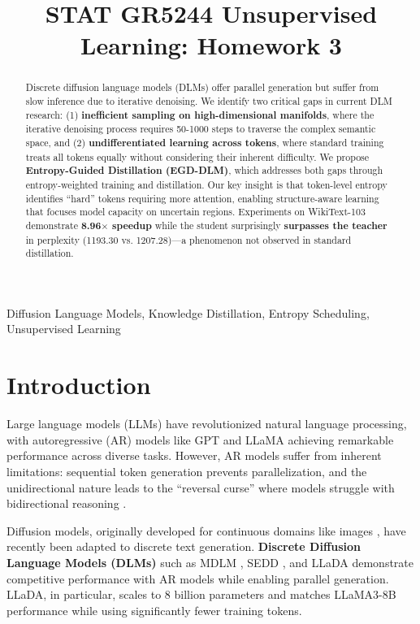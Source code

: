 \documentclass[conference]{IEEEtran}
\title{STAT GR5244 Unsupervised Learning: Homework 3}
\author{
\IEEEauthorblockN{Jiayi Chen}
\IEEEauthorblockA{Department of Statistics\\
Columbia University\\
New York, NY 10027\\
\texttt{jc6601@columbia.edu}}
}
\begin{document}
\maketitle

\begin{abstract}
Discrete diffusion language models (DLMs) offer parallel generation but suffer from slow inference due to iterative denoising. We identify two critical gaps in current DLM research: (1) \textbf{inefficient sampling on high-dimensional manifolds}, where the iterative denoising process requires 50-1000 steps to traverse the complex semantic space, and (2) \textbf{undifferentiated learning across tokens}, where standard training treats all tokens equally without considering their inherent difficulty. We propose \textbf{Entropy-Guided Distillation (EGD-DLM)}, which addresses both gaps through entropy-weighted training and distillation. Our key insight is that token-level entropy identifies ``hard'' tokens requiring more attention, enabling structure-aware learning that focuses model capacity on uncertain regions. Experiments on WikiText-103 demonstrate \textbf{8.96$\times$ speedup} while the student surprisingly \textbf{surpasses the teacher} in perplexity (1193.30 vs. 1207.28)---a phenomenon not observed in standard distillation.
\end{abstract}

\begin{IEEEkeywords}
Diffusion Language Models, Knowledge Distillation, Entropy Scheduling, Unsupervised Learning
\end{IEEEkeywords}

\section{Introduction}
\label{sec:intro}

Large language models (LLMs) have revolutionized natural language processing, with autoregressive (AR) models like GPT \cite{radford2019language} and LLaMA \cite{touvron2023llama} achieving remarkable performance across diverse tasks. However, AR models suffer from inherent limitations: sequential token generation prevents parallelization, and the unidirectional nature leads to the ``reversal curse'' where models struggle with bidirectional reasoning \cite{berglund2023reversal}.

Diffusion models, originally developed for continuous domains like images \cite{ho2020denoising, song2020score}, have recently been adapted to discrete text generation. \textbf{Discrete Diffusion Language Models (DLMs)} such as MDLM \cite{sahoo2024simple}, SEDD \cite{lou2024discrete}, and LLaDA \cite{nie2025llada} demonstrate competitive performance with AR models while enabling parallel generation. LLaDA, in particular, scales to 8 billion parameters and matches LLaMA3-8B performance while using significantly fewer training tokens.
\end{document}
